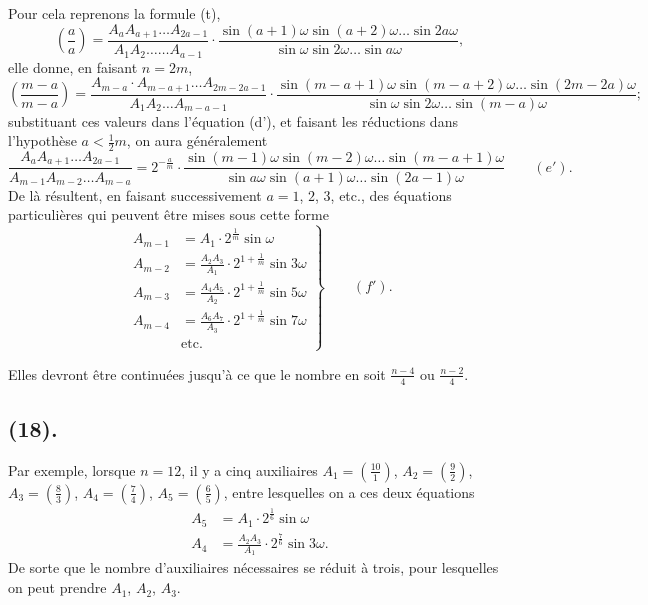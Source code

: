 \documentclass{article}
\begin{document}
Pour cela reprenons la formule (t),
\[ \left(\frac{a}{a}\right)=\frac{A_{a}A_{a+1}\ldots A_{2a-1}}{A_{1}A_{2}\ldots\ldots A_{a-1}}\cdot\frac{\sin(a+1)\omega\sin(a+2)\omega\ldots\sin 2a\omega}{\sin\omega\sin 2\omega\ldots\sin a\omega}, \]
elle donne, en faisant $n=2m$,
\[ \left(\frac{m-a}{m-a}\right)=\frac{A_{m-a}\cdot A_{m-a+1}\ldots A_{2m-2a-1}}{A_{1}A_{2}\ldots A_{m-a-1}}\cdot\frac{\sin(m-a+1)\omega\sin(m-a+2)\omega\ldots\sin(2m-2a)\omega}{\sin\omega\sin 2\omega\ldots\sin(m-a)\omega}; \]
substituant ces valeurs dans l'équation (d'), et faisant les réductions dans l'hypothèse $a<\frac{1}{2}m$, on aura généralement
\[ \frac{A_{a}A_{a+1}\ldots A_{2a-1}}{A_{m-1}A_{m-2}\ldots A_{m-a}}=2^{-\frac{a}{m}}\cdot\frac{\sin(m-1)\omega\sin(m-2)\omega\ldots\sin(m-a+1)\omega}{\sin a\omega\sin(a+1)\omega\ldots\sin(2a-1)\omega}\qquad(e'). \]
De là résultent, en faisant successivement $a=1$, $2$, $3$, etc., des équations particulières qui peuvent être mises sous cette forme
\[ \left.\begin{aligned} A_{m-1}&=A_{1}\cdot 2^{\frac{1}{m}}\sin\omega\\ A_{m-2}&=\frac{A_{2}A_{3}}{A_{1}}\cdot 2^{1+\frac{1}{m}}\sin 3\omega\\ A_{m-3}&=\frac{A_{4}A_{5}}{A_{2}}\cdot 2^{1+\frac{1}{m}}\sin 5\omega\\ A_{m-4}&=\frac{A_{6}A_{7}}{A_{3}}\cdot 2^{1+\frac{1}{m}}\sin 7\omega\\ &\text{etc.} \end{aligned}\right\}\qquad(f'). \]

Elles devront être continuées jusqu'à ce que le nombre en soit $\frac{n-4}{4}$ ou $\frac{n-2}{4}$.

\subsection*{(18).}

Par exemple, lorsque $n=12$, il y a cinq auxiliaires $A_{1}=\left(\frac{10}{1}\right)$, $A_{2}=\left(\frac{9}{2}\right)$, $A_{3}=\left(\frac{8}{3}\right)$, $A_{4}=\left(\frac{7}{4}\right)$, $A_{5}=\left(\frac{6}{5}\right)$, entre lesquelles on a ces deux équations
\[ \begin{aligned} A_{5}&=A_{1}\cdot 2^{\frac{1}{6}}\sin\omega\\ A_{4}&=\frac{A_{2}A_{3}}{A_{1}}\cdot 2^{\frac{7}{6}}\sin 3\omega. \end{aligned} \]
De sorte que le nombre d'auxiliaires nécessaires se réduit à trois, pour lesquelles on peut prendre $A_{1}$, $A_{2}$, $A_{3}$.
\end{document}
